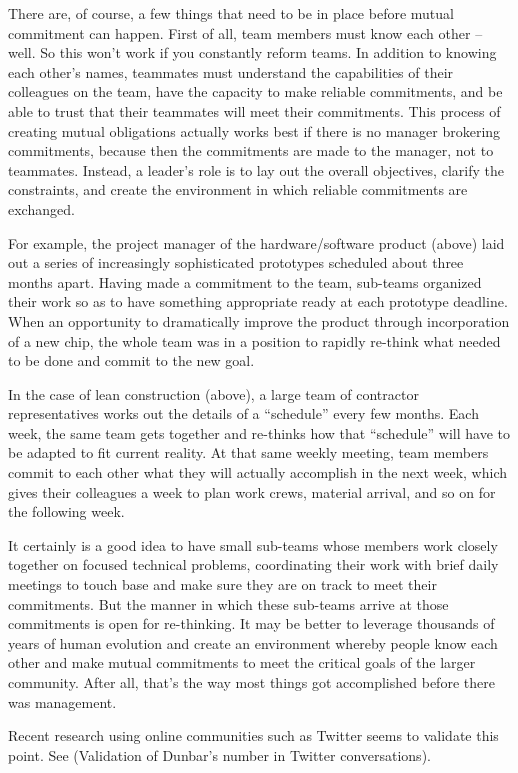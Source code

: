 There are, of course, a few things that need to be in place before mutual commitment can happen. First of all, team members must know each other – well. So this won’t work if you constantly reform teams. In addition to knowing each other’s names, teammates must understand the capabilities of their colleagues on the team, have the capacity to make reliable commitments, and be able to trust that their teammates will meet their commitments. This process of creating mutual obligations actually works best if there is no manager brokering commitments, because then the commitments are made to the manager, not to teammates. Instead, a leader’s role is to lay out the overall objectives, clarify the constraints, and create the environment in which reliable commitments are exchanged.

For example, the project manager of the hardware/software product (above) laid out a series of increasingly sophisticated prototypes scheduled about three months apart. Having made a commitment to the team, sub-teams organized their work so as to have something appropriate ready at each prototype deadline. When an opportunity to dramatically improve the product through incorporation of a new chip, the whole team was in a position to rapidly re-think what needed to be done and commit to the new goal.

In the case of lean construction (above), a large team of contractor representatives works out the details of a “schedule” every few months. Each week, the same team gets together and re-thinks how that “schedule” will have to be adapted to fit current reality. At that same weekly meeting, team members commit to each other what they will actually accomplish in the next week, which gives their colleagues a week to plan work crews, material arrival, and so on for the following week.

It certainly is a good idea to have small sub-teams whose members work closely together on focused technical problems, coordinating their work with brief daily meetings to touch base and make sure they are on track to meet their commitments. But the manner in which these sub-teams arrive at those commitments is open for re-thinking. It may be better to leverage thousands of years of human evolution and create an environment whereby people know each other and make mutual commitments to meet the critical goals of the larger community. After all, that’s the way most things got accomplished before there was management.


Recent research using online communities such as Twitter seems to validate this point. See (Validation of Dunbar's number in Twitter conversations).

